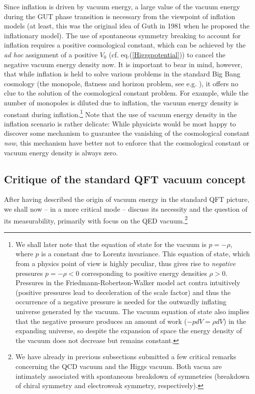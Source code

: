 \documentclass[12pt]{article}
\def\ss{\subsection}
\begin{document}
Since inflation is driven by vacuum energy, a large value of the
vacuum energy during the GUT phase transition is necessary from
the viewpoint of inflation models (at least, this was the original
idea of Guth in 1981 when he proposed the inflationary model). The
use of spontaneous symmetry breaking to account for inflation
requires a positive cosmological constant, which can be achieved
by the {\em ad hoc} assignment of a positive $V_0$ (cf.
eq.(\ref{Higgspotential})) to cancel the negative vacuum energy
density now. It is important to bear in mind, however, that while
inflation is held to solve various problems in the standard Big
Bang cosmology (the monopole, flatness and horizon problem, see
e.g. \cite{earman99}), it offers no clue to the solution of the
cosmological constant problem. For example, while the number of
monopoles is diluted due to inflation, the vacuum energy density
is constant during inflation.\footnote{We shall later note that
the equation of state for the vacuum is $ p = - \rho$, where $p$
is a constant due to Lorentz invariance. This equation of state,
which from a physics point of view is highly peculiar, thus gives
rise to {\em negative} pressures $ p = - \rho < 0$ corresponding
to positive energy densities $\rho > 0$. Pressures in the
Friedmann-Robertson-Walker model act contra intuitively (positive
pressures lead to deceleration of the scale factor) and thus the
occurrence of a negative pressure is needed for the outwardly
inflating universe generated by the vacuum. The vacuum equation of
state also implies that the negative pressure produces an amount
of work ($- p dV = \rho dV$) in the expanding universe, so despite
the expansion of space the energy density of the vacuum does not
decrease but remains constant.} Note that the use of vacuum energy
density in the inflation scenario is rather delicate: While
physicists would be most happy to discover some mechanism to
guarantee the vanishing of the cosmological constant {\em now},
this mechanism have better not to enforce that the cosmological
constant or vacuum energy density is always zero.

\ss{Critique of the standard QFT vacuum concept}

After having described the origin of vacuum energy in the standard
QFT picture, we shall now -- in a more critical mode -- discuss
its necessity and the question of its measurability, primarily
with focus on the QED vacuum.\footnote{We have already in previous
subsections submitted a few critical remarks concerning the QCD
vacuum and the Higgs vacuum. Both vacua are intimately associated
with spontaneous breakdown of symmetries (breakdown of chiral
symmetry and electroweak symmetry, respectively).}
\end{document}
